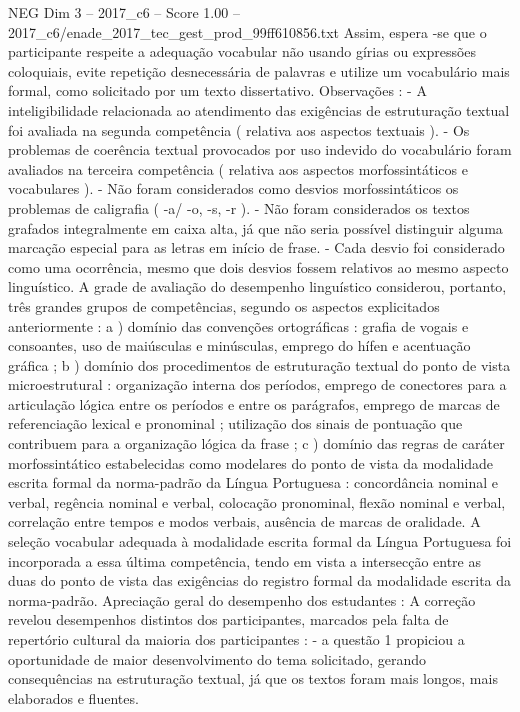 \begin{textsample}{NEG Dim 3 – 2017\_c6 – Score 1.00 – 2017\_c6/enade\_2017\_tec\_gest\_prod\_99ff610856.txt}
Assim, espera -se que o participante respeite a adequação vocabular não usando gírias ou expressões coloquiais, evite repetição desnecessária de palavras e utilize um vocabulário mais formal, como solicitado por um texto dissertativo.
Observações : - A inteligibilidade relacionada ao atendimento das exigências de estruturação textual foi avaliada na segunda competência ( relativa aos aspectos textuais ). - Os problemas de coerência textual provocados por uso indevido do vocabulário foram avaliados na terceira competência ( relativa aos aspectos morfossintáticos e vocabulares ). - Não foram considerados como desvios morfossintáticos os problemas de caligrafia ( -a/ -o, -s, -r ). - Não foram considerados os textos grafados integralmente em caixa alta, já que não seria possível distinguir alguma marcação especial para as letras em início de frase. - Cada desvio foi considerado como uma ocorrência, mesmo que dois desvios fossem relativos ao mesmo aspecto linguístico.
A grade de avaliação do desempenho linguístico considerou, portanto, três grandes grupos de competências, segundo os aspectos explicitados anteriormente : a ) domínio das convenções ortográficas : grafia de vogais e consoantes, uso de maiúsculas e minúsculas, emprego do hífen e acentuação gráfica ; b ) domínio dos procedimentos de estruturação textual do ponto de vista microestrutural : organização interna dos períodos, emprego de conectores para a articulação lógica entre os períodos e entre os parágrafos, emprego de marcas de referenciação lexical e pronominal ; utilização dos sinais de pontuação que contribuem para a organização lógica da frase ; c ) domínio das regras de caráter morfossintático estabelecidas como modelares do ponto de vista da modalidade escrita formal da norma-padrão da Língua Portuguesa : concordância nominal e verbal, regência nominal e verbal, colocação pronominal, flexão nominal e verbal, correlação entre tempos e modos verbais, ausência de marcas de oralidade.
A seleção vocabular adequada à modalidade escrita formal da Língua Portuguesa foi incorporada a essa última competência, tendo em vista a intersecção entre as duas do ponto de vista das exigências do registro formal da modalidade escrita da norma-padrão.
Apreciação geral do desempenho dos estudantes : A correção revelou desempenhos distintos dos participantes, marcados pela falta de repertório cultural da maioria dos participantes : - a questão 1 propiciou a oportunidade de maior desenvolvimento do tema solicitado, gerando consequências na estruturação textual, já que os textos foram mais longos, mais elaborados e fluentes.

\end{textsample}
